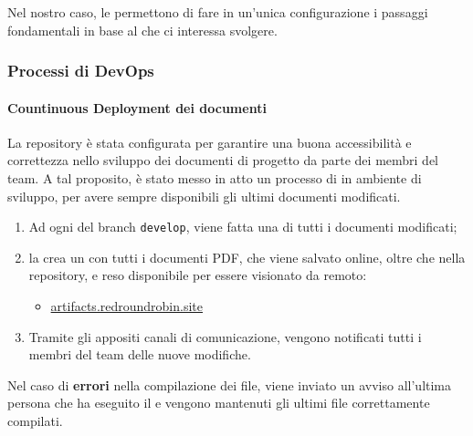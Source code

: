 	Nel nostro caso, le  permettono di fare in un'unica configurazione i passaggi fondamentali in base al  che ci interessa svolgere. 



\subsubsection{Processi di DevOps} %

	\paragraph{Countinuous Deployment dei documenti}
	\label{sec:cd_docs}

	La repository è stata configurata per garantire una buona accessibilità e correttezza nello sviluppo dei documenti di progetto da parte dei membri del team. A tal proposito, è stato messo in atto un processo di  in ambiente di sviluppo, per avere sempre disponibili gli ultimi documenti modificati.

	\begin{enumerate}
		\item Ad ogni  del branch \verb!develop!, viene fatta una  di tutti i documenti modificati;
		\item la  crea un  con tutti i documenti PDF, che viene salvato online, oltre che nella repository, e reso disponibile per essere visionato da remoto:
		\begin{itemize}
			\item \href{https://artifacts.redroundrobin.site}{artifacts.redroundrobin.site}
		\end{itemize}
		\item Tramite gli appositi canali di comunicazione, vengono notificati tutti i membri del team delle nuove modifiche.
	\end{enumerate}

	Nel caso di \textbf{errori} nella compilazione dei file, viene inviato un avviso all'ultima persona che ha eseguito il  e vengono mantenuti gli ultimi file correttamente compilati.
